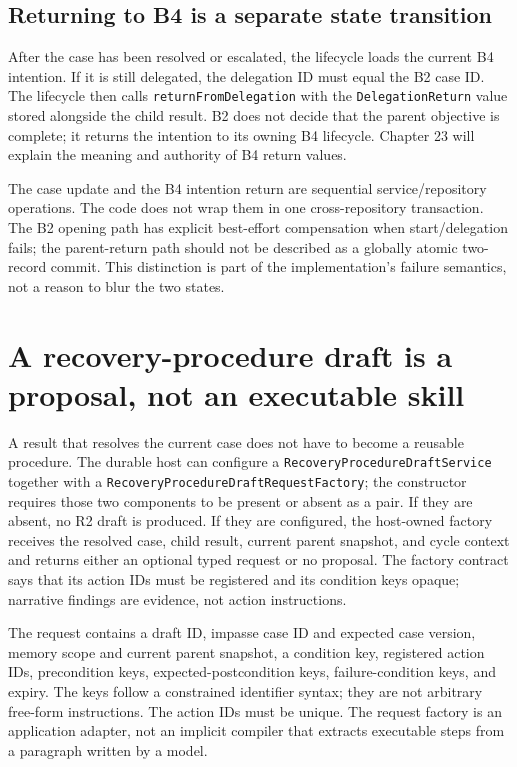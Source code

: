 \subsection{Returning to B4 is a separate state transition}
\label{subsec:ch22-return-b4}

After the case has been resolved or escalated, the lifecycle loads the current B4 intention. If it is still delegated, the delegation ID must equal the B2 case ID. The lifecycle then calls \texttt{return\allowbreak From\allowbreak Delegation} with the \texttt{Delegation\allowbreak Return} value stored alongside the child result. B2 does not decide that the parent objective is complete; it returns the intention to its owning B4 lifecycle. Chapter 23 will explain the meaning and authority of B4 return values.

The case update and the B4 intention return are sequential service/repository operations. The code does not wrap them in one cross-repository transaction. The B2 opening path has explicit best-effort compensation when start/delegation fails; the parent-return path should not be described as a globally atomic two-record commit. This distinction is part of the implementation's failure semantics, not a reason to blur the two states.

\section{A recovery-procedure draft is a proposal, not an executable skill}
\label{sec:ch22-recovery-draft}

A result that resolves the current case does not have to become a reusable procedure. The durable host can configure a \texttt{Recovery\allowbreak Procedure\allowbreak Draft\allowbreak Service} together with a \texttt{Recovery\allowbreak Procedure\allowbreak Draft\allowbreak Request\allowbreak Factory}; the constructor requires those two components to be present or absent as a pair. If they are absent, no R2 draft is produced. If they are configured, the host-owned factory receives the resolved case, child result, current parent snapshot, and cycle context and returns either an optional typed request or no proposal. The factory contract says that its action IDs must be registered and its condition keys opaque; narrative findings are evidence, not action instructions.

The request contains a draft ID, impasse case ID and expected case version, memory scope and current parent snapshot, a condition key, registered action IDs, precondition keys, expected-postcondition keys, failure-condition keys, and expiry. The keys follow a constrained identifier syntax; they are not arbitrary free-form instructions. The action IDs must be unique. The request factory is an application adapter, not an implicit compiler that extracts executable steps from a paragraph written by a model.

